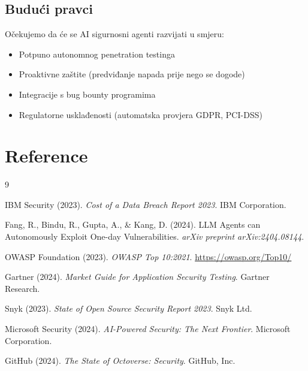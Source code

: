 \documentclass[12pt,a4paper]{article}
\begin{document}
\subsection{Budući pravci}

Očekujemo da će se AI sigurnosni agenti razvijati u smjeru:
\begin{itemize}
    \item Potpuno autonomnog penetration testinga
    \item Proaktivne zaštite (predviđanje napada prije nego se dogode)
    \item Integracije s bug bounty programima
    \item Regulatorne usklađenosti (automatska provjera GDPR, PCI-DSS)
\end{itemize}

\section*{Reference}

\begin{thebibliography}{9}

IBM Security (2023). \textit{Cost of a Data Breach Report 2023}. IBM Corporation.

Fang, R., Bindu, R., Gupta, A., \& Kang, D. (2024). LLM Agents can Autonomously Exploit One-day Vulnerabilities. \textit{arXiv preprint arXiv:2404.08144}.

OWASP Foundation (2023). \textit{OWASP Top 10:2021}. \url{https://owasp.org/Top10/}

Gartner (2024). \textit{Market Guide for Application Security Testing}. Gartner Research.

Snyk (2023). \textit{State of Open Source Security Report 2023}. Snyk Ltd.

Microsoft Security (2024). \textit{AI-Powered Security: The Next Frontier}. Microsoft Corporation.

GitHub (2024). \textit{The State of Octoverse: Security}. GitHub, Inc.

\end{thebibliography}
\end{document}
